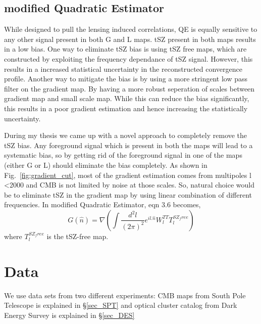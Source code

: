 \subsection{modified Quadratic Estimator}
While designed to pull the lensing induced correlations, QE is equally sensitive to any other signal present in both G and L maps.
 tSZ present in both maps results in a low bias.
 One way to eliminate tSZ bias is using tSZ free maps, which are constructed by exploiting the frequency dependance of tSZ signal.
 However, this results in a increased statistical uncertainty in the reconstructed convergence profile.
 Another way to mitigate the bias is by using a more stringent low pass filter on the gradient map. %
 By having a more robust seperation of scales between gradient map and small scale map.
 While this can reduce the bias significantly, this results in a poor gradient estimation and hence increasing the statistically uncertainty.

 
 During my thesis we came up with a novel approach to completely remove the tSZ bias. 
 Any foreground signal which is present in both the maps will lead to a systematic bias, so by getting rid of the foreground signal in one of the maps (either G or L) should eliminate the bias completely.
  As shown in Fig.~\ref{fig:gradient_cut}, most of the gradient estimation comes from multipoles l <2000 and CMB is not limited by noise at those scales.
  So, natural choice would be to eliminate tSZ in the gradient map by using linear combination of different frequencies. 
  In modified Quadratic Estimator, eqn 3.6 becomes,
  \begin{equation}
   G(\hat{n}) = \nabla (\int\frac{d^{2}l}{(2\pi)^{2}} e^{il .\hat{n}} W^{TT}_{l} T^{SZ_free}_{l}   )
  \end{equation}
  where $T^{SZ_free}_{l} $ is the tSZ-free map.
\section{Data}
\label{sec_data}
We use data sets from two different experiments: CMB maps from South Pole Telescope is explained in \S\ref{sec_SPT} and 
optical cluster catalog from Dark Energy Survey is explained in \S\ref{sec_DES}

